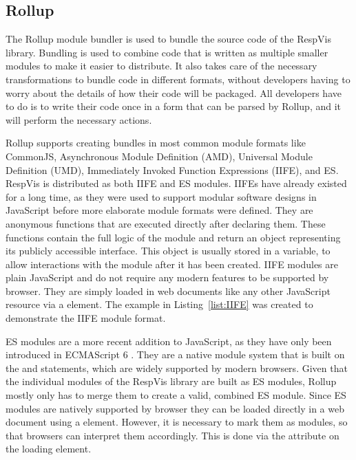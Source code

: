 \subsection{Rollup}
\label{sec:Rollup}


The Rollup module bundler is used to bundle the source code of the RespVis library.
Bundling is used to combine code that is written as multiple smaller modules to make it easier to distribute.
It also takes care of the necessary transformations to bundle code in different formats, without developers having to worry about the details of how their code will be packaged.
All developers have to do is to write their code once in a form that can be parsed by Rollup, and it will perform the necessary actions.

Rollup supports creating bundles in most common module formats like CommonJS, Asynchronous Module Definition (AMD), Universal Module Definition (UMD), Immediately Invoked Function Expressions (IIFE), and ES.
RespVis is distributed as both IIFE and ES modules.
IIFEs have already existed for a long time, as they were used to support modular software designs in JavaScript before more elaborate module formats were defined.
They are anonymous functions that are executed directly after declaring them.
These functions contain the full logic of the module and return an object representing its publicly accessible interface.
This object is usually stored in a variable, to allow interactions with the module after it has been created. 
IIFE modules are plain JavaScript and do not require any modern features to be supported by browser.
They are simply loaded in web documents like any other JavaScript resource via a  element.
The example in Listing~\ref{list:IIFE} was created to demonstrate the IIFE module format. 

ES modules are a more recent addition to JavaScript, as they have only been introduced in ECMAScript 6 \parencite{ECMAScript6}.
They are a native module system that is built on the  and  statements, which are widely supported by modern browsers.
Given that the individual modules of the RespVis library are built as ES modules, Rollup mostly only has to merge them to create a valid, combined ES module.
Since ES modules are natively supported by browser they can be loaded directly in a web document using a  element.
However, it is necessary to mark them as modules, so that browsers can interpret them accordingly.
This is done via the  attribute on the loading  element.


